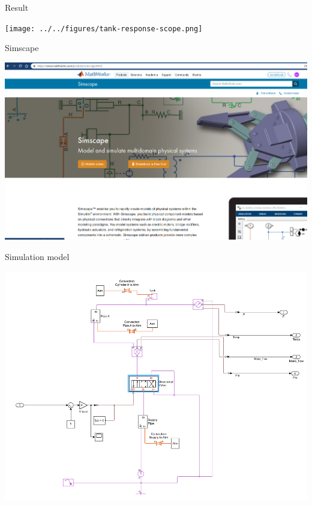 \documentclass[presentation,aspectratio=1610]{beamer}
\begin{document}
\begin{frame}[label={sec:org382e73f}]{Result}
\begin{center}
\texttt{[image: ../../figures/tank-response-scope.png]}
\end{center}
\end{frame}

\begin{frame}[label={sec:orgdb8f573}]{Simscape}
\begin{center}
\includegraphics[width=\linewidth]{../../figures/simscape.png}
\end{center}
\end{frame}

\begin{frame}[label={sec:org2b5a140}]{Simulation model}
\begin{center}
\includegraphics[width=0.8\linewidth]{../../figures/tank-simscape-model.png}
\end{center}
\end{frame}
\end{document}
